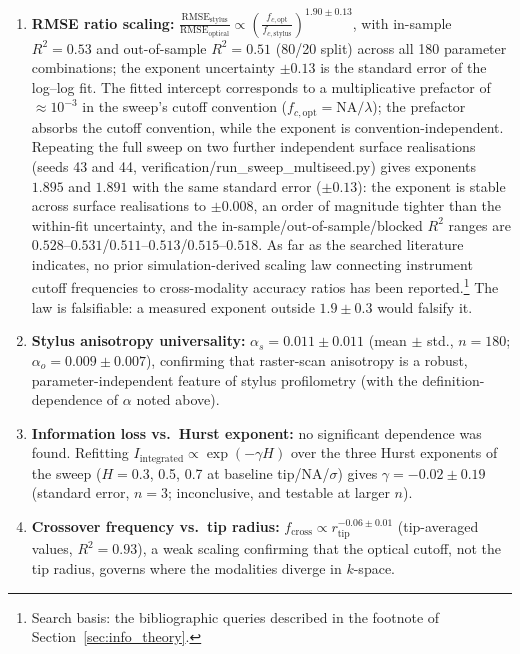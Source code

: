 \documentclass[review,12pt]{elsarticle}
\begin{document}
\begin{enumerate}
    \item \textbf{RMSE ratio scaling:} $\displaystyle \frac{\mathrm{RMSE}_\mathrm{stylus}}{\mathrm{RMSE}_\mathrm{optical}} \propto \left(\frac{f_{c,\mathrm{opt}}}{f_{c,\mathrm{stylus}}}\right)^{1.90 \pm 0.13}$, with in-sample $R^2 = 0.53$ and out-of-sample $R^2 = 0.51$ (80/20 split) across all 180 parameter combinations; the exponent uncertainty $\pm 0.13$ is the standard error of the log--log fit. The fitted intercept corresponds to a multiplicative prefactor of $\approx10^{-3}$ in the sweep's cutoff convention ($f_{c,\mathrm{opt}}=\mathrm{NA}/\lambda$); the prefactor absorbs the cutoff convention, while the exponent is convention-independent. Repeating the full sweep on two further independent surface realisations (seeds 43 and 44, verification/run\_sweep\_multiseed.py) gives exponents $1.895$ and $1.891$ with the same standard error ($\pm0.13$): the exponent is stable across surface realisations to $\pm0.008$, an order of magnitude tighter than the within-fit uncertainty, and the in-sample/out-of-sample/blocked $R^2$ ranges are $0.528$--$0.531$/$0.511$--$0.513$/$0.515$--$0.518$. As far as the searched literature indicates, no prior simulation-derived scaling law connecting instrument cutoff frequencies to cross-modality accuracy ratios has been reported.\footnote{Search basis: the bibliographic queries described in the footnote of Section~\ref{sec:info_theory}.} The law is falsifiable: a measured exponent outside $1.9 \pm 0.3$ would falsify it.

    \item \textbf{Stylus anisotropy universality:} $\alpha_s = 0.011 \pm 0.011$ (mean $\pm$ std., $n=180$; $\alpha_o = 0.009 \pm 0.007$), confirming that raster-scan anisotropy is a robust, parameter-independent feature of stylus profilometry (with the definition-dependence of $\alpha$ noted above).

    \item \textbf{Information loss vs.\ Hurst exponent:} no significant dependence was found. Refitting $I_\mathrm{integrated} \propto \exp(-\gamma H)$ over the three Hurst exponents of the sweep ($H = 0.3$, 0.5, 0.7 at baseline tip/NA/$\sigma$) gives $\gamma = -0.02 \pm 0.19$ (standard error, $n=3$; inconclusive, and testable at larger $n$).

    \item \textbf{Crossover frequency vs.\ tip radius:} $f_\mathrm{cross} \propto r_\mathrm{tip}^{-0.06\pm0.01}$ (tip-averaged values, $R^2=0.93$), a weak scaling confirming that the optical cutoff, not the tip radius, governs where the modalities diverge in $k$-space.
\end{enumerate}
\end{document}
